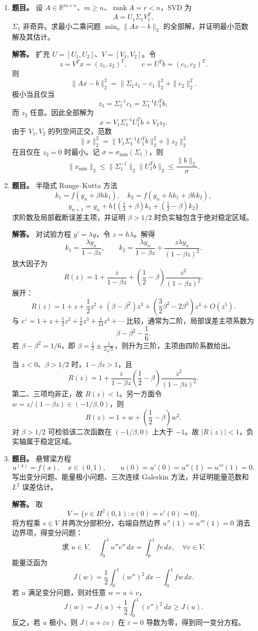﻿\documentclass[UTF8,12pt]{ctexart}
\begin{document}
\begin{enumerate}[label=\textbf{\arabic*.},leftmargin=2.2em]
\item \textbf{题目。} 设 \(A\in\mathbb R^{m\times n}\)、\(m\ge n\)、\(\operatorname{rank}A=r<n\)，SVD 为
\[
A=U_1\Sigma_1V_1^T,
\]
\(\Sigma_1\) 非奇异。求最小二乘问题 \(\min_x\|Ax-b\|_2\) 的全部解，并证明最小范数解及其估计。

\textbf{解答。} 扩充 \(U=[U_1,U_2]\)、\(V=[V_1,V_2]\)。令
\[
z=V^Tx=(z_1,z_2)^T,\qquad c=U^Tb=(c_1,c_2)^T.
\]
则
\[
\|Ax-b\|_2^2=\|\Sigma_1z_1-c_1\|_2^2+\|c_2\|_2^2.
\]
极小当且仅当
\[
z_1=\Sigma_1^{-1}c_1=\Sigma_1^{-1}U_1^Tb,
\]
而 \(z_2\) 任意。因此全部解为
\[
x=V_1\Sigma_1^{-1}U_1^Tb+V_2z_2.
\]
由于 \(V_1,V_2\) 的列空间正交，范数
\[
\|x\|_2^2=\|V_1\Sigma_1^{-1}U_1^Tb\|_2^2+\|z_2\|_2^2
\]
在且仅在 \(z_2=0\) 时最小。记 \(\sigma=\sigma_{\min}(\Sigma_1)\)，则
\[
\|x_{\min}\|_2\le \|\Sigma_1^{-1}\|_2\|U_1^Tb\|_2
\le \frac{\|b\|_2}{\sigma}.
\]

\item \textbf{题目。} 半隐式 Runge--Kutta 方法
\[
k_1=f(y_n+\beta hk_1),\quad
k_2=f(y_n+hk_1+\beta hk_2),
\]
\[
y_{n+1}=y_n+h\{(\tfrac12+\beta)k_1+(\tfrac12-\beta)k_2\}
\]
求阶数及局部截断误差主项，并证明 \(\beta>1/2\) 时负实轴包含于绝对稳定区域。

\textbf{解答。} 对试验方程 \(y'=\lambda y\)，令 \(z=h\lambda\)。解得
\[
k_1=\frac{\lambda y_n}{1-\beta z},\qquad
k_2=\frac{\lambda y_n}{1-\beta z}+\frac{z\lambda y_n}{(1-\beta z)^2}.
\]
放大因子为
\[
R(z)=1+\frac{z}{1-\beta z}+\left(\frac12-\beta\right)\frac{z^2}{(1-\beta z)^2}.
\]
展开：
\[
R(z)=1+z+\frac12z^2+(\beta-\beta^2)z^3+\left(\frac32\beta^2-2\beta^3\right)z^4+O(z^5).
\]
与 \(e^z=1+z+\frac12z^2+\frac16z^3+\frac1{24}z^4+\cdots\) 比较，通常为二阶，局部误差主项系数为
\[
\beta-\beta^2-\frac16.
\]
若 \(\beta-\beta^2=1/6\)，即 \(\beta=\frac12\pm\frac1{2\sqrt3}\)，则升为三阶，主项由四阶系数给出。

当 \(z<0\)、\(\beta>1/2\) 时，\(1-\beta z>1\)，且
\[
R(z)=1+\frac{z}{1-\beta z}
\left(\frac12-\beta\right)\frac{z^2}{(1-\beta z)^2}.
\]
第二、三项均非正，故 \(R(z)<1\)。另一方面令 \(w=z/(1-\beta z)\in(-1/\beta,0)\)，则
\[
R(z)=1+w+\left(\frac12-\beta\right)w^2.
\]
对 \(\beta>1/2\) 可检验该二次函数在 \((-1/\beta,0)\) 上大于 \(-1\)。故 \(|R(z)|<1\)，负实轴属于稳定区域。

\item \textbf{题目。} 悬臂梁方程
\[
u^{(4)}=f(x),\quad x\in(0,1),\qquad
u(0)=u'(0)=u''(1)=u'''(1)=0.
\]
写出变分问题、能量极小问题、三次连续 Galerkin 方法，并证明能量范数和 \(L^2\) 误差估计。

\textbf{解答。} 取
\[
V=\{v\in H^2(0,1):v(0)=v'(0)=0\}.
\]
将方程乘 \(v\in V\) 并两次分部积分，右端自然边界 \(u''(1)=u'''(1)=0\) 消去边界项，得变分问题：
\[
\text{求 }u\in V,\quad
\int_0^1 u''v''\,dx=\int_0^1 fv\,dx,\quad \forall v\in V.
\]
能量泛函为
\[
J(w)=\frac12\int_0^1 (w'')^2\,dx-\int_0^1fw\,dx.
\]
若 \(u\) 满足变分问题，则对任意 \(w=u+v\)，
\[
J(w)=J(u)+\frac12\int_0^1(v'')^2\,dx\ge J(u).
\]
反之，若 \(u\) 极小，则 \(J(u+\varepsilon v)\) 在 \(\varepsilon=0\) 导数为零，得到同一变分方程。


\end{enumerate}
\end{document}
